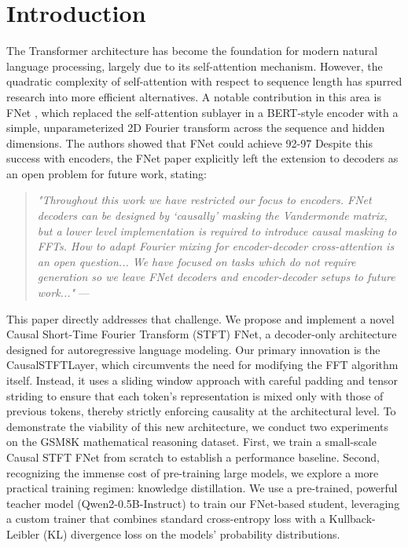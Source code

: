 \documentclass[11pt,a4paper]{article}
\begin{document}
\section{Introduction}
The Transformer architecture \citep{vaswani2017attention} has become the foundation for modern natural language processing, largely due to its self-attention mechanism. However, the quadratic complexity of self-attention with respect to sequence length has spurred research into more efficient alternatives. A notable contribution in this area is FNet \citep{lee2021fnet}, which replaced the self-attention sublayer in a BERT-style encoder with a simple, unparameterized 2D Fourier transform across the sequence and hidden dimensions. The authors showed that FNet could achieve 92-97%
Despite this success with encoders, the FNet paper explicitly left the extension to decoders as an open problem for future work, stating:
\begin{quote}
\textit{"Throughout this work we have restricted our focus to encoders. FNet decoders can be designed by `causally' masking the Vandermonde matrix, but a lower level implementation is required to introduce causal masking to FFTs. How to adapt Fourier mixing for encoder-decoder cross-attention is an open question... We have focused on tasks which do not require generation so we leave FNet decoders and encoder-decoder setups to future work..."} --- \citet{lee2021fnet}
\end{quote}
This paper directly addresses that challenge. We propose and implement a novel Causal Short-Time Fourier Transform (STFT) FNet, a decoder-only architecture designed for autoregressive language modeling. Our primary innovation is the CausalSTFTLayer, which circumvents the need for modifying the FFT algorithm itself. Instead, it uses a sliding window approach with careful padding and tensor striding to ensure that each token's representation is mixed only with those of previous tokens, thereby strictly enforcing causality at the architectural level.
To demonstrate the viability of this new architecture, we conduct two experiments on the GSM8K mathematical reasoning dataset. First, we train a small-scale Causal STFT FNet from scratch to establish a performance baseline. Second, recognizing the immense cost of pre-training large models, we explore a more practical training regimen: knowledge distillation. We use a pre-trained, powerful teacher model (Qwen2-0.5B-Instruct) to train our FNet-based student, leveraging a custom trainer that combines standard cross-entropy loss with a Kullback-Leibler (KL) divergence loss on the models' probability distributions.
\end{document}
